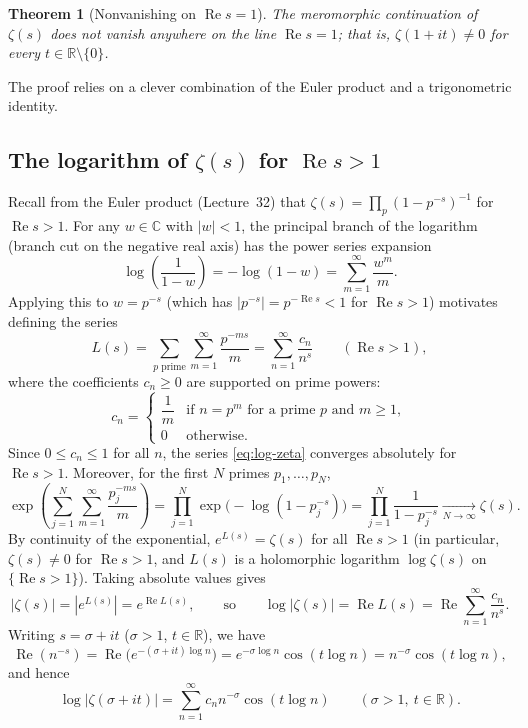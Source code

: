 \documentclass[11pt]{article}
\theoremstyle{plain}
\newtheorem{theorem}{Theorem}[section]
\theoremstyle{definition}
\theoremstyle{boldremark}
\theoremstyle{remark}
\numberwithin{equation}{section}
\newcommand{\C}{\mathbb{C}}
\newcommand{\R}{\mathbb{R}}
\DeclareMathOperator{\Real}{Re}
\begin{document}
\begin{theorem}[Nonvanishing on $\Real s = 1$]\label{thm:nonvanishing}
The meromorphic continuation of $\zeta(s)$ does not vanish anywhere on the
line $\Real s = 1$; that is, $\zeta(1+it)\neq 0$ for every $t\in\R\setminus\{0\}$.
\end{theorem}

The proof relies on a clever combination of the Euler product and a
trigonometric identity.

\subsection{The logarithm of $\zeta(s)$ for $\Real s > 1$}

Recall from the Euler product (Lecture~32) that
$\zeta(s)=\prod_{p}(1-p^{-s})^{-1}$ for $\Real s > 1$. For any $w\in\C$
with $|w|<1$, the principal branch of the logarithm (branch cut on the
negative real axis) has the power series expansion
\[
 \log\!\left(\frac{1}{1-w}\right) = -\log(1-w) = \sum_{m=1}^{\infty}\frac{w^m}{m}.
\]
Applying this to $w=p^{-s}$ (which has $|p^{-s}|=p^{-\Real s}<1$ for
$\Real s > 1$) motivates defining the series
\begin{equation}\label{eq:log-zeta}
 L(s) = \sum_{p\text{ prime}}\sum_{m=1}^{\infty}\frac{p^{-ms}}{m}
      = \sum_{n=1}^{\infty}\frac{c_n}{n^s}
 \qquad (\Real s > 1),
\end{equation}
where the coefficients $c_n\geq 0$ are supported on prime powers:
\[
 c_n = \begin{cases}
        \dfrac{1}{m} & \text{if } n = p^m \text{ for a prime } p \text{ and } m\geq 1,\\[6pt]
        0 & \text{otherwise.}
       \end{cases}
\]
Since $0\leq c_n\leq 1$ for all $n$, the series \eqref{eq:log-zeta}
converges absolutely for $\Real s > 1$. Moreover, for the first $N$ primes
$p_1,\dots,p_N$,
\[
 \exp\!\left(\sum_{j=1}^{N}\sum_{m=1}^{\infty}\frac{p_j^{-ms}}{m}\right)
 = \prod_{j=1}^{N}\exp\bigl(-\log(1-p_j^{-s})\bigr)
 = \prod_{j=1}^{N}\frac{1}{1-p_j^{-s}}
 \xrightarrow[N\to\infty]{} \zeta(s).
\]
By continuity of the exponential, $e^{L(s)}=\zeta(s)$ for all $\Real s > 1$
(in particular, $\zeta(s)\neq 0$ for $\Real s > 1$, and $L(s)$ is a
holomorphic logarithm $\log\zeta(s)$ on $\{\Real s > 1\}$). Taking absolute
values gives
\[
 |\zeta(s)| = |e^{L(s)}| = e^{\Real L(s)},
 \qquad\text{so}\qquad
 \log|\zeta(s)| = \Real L(s) = \Real\sum_{n=1}^{\infty}\frac{c_n}{n^s}.
\]
Writing $s=\sigma+it$ ($\sigma > 1$, $t\in\R$), we have
\[
 \Real(n^{-s}) = \Real\bigl(e^{-(\sigma+it)\log n}\bigr)
               = e^{-\sigma\log n}\cos(t\log n)
               = n^{-\sigma}\cos(t\log n),
\]
and hence
\begin{equation}\label{eq:log-abs-zeta}
 \log|\zeta(\sigma+it)|
 = \sum_{n=1}^{\infty} c_n n^{-\sigma}\cos(t\log n)
 \qquad (\sigma > 1,\ t\in\R).
\end{equation}
\end{document}
